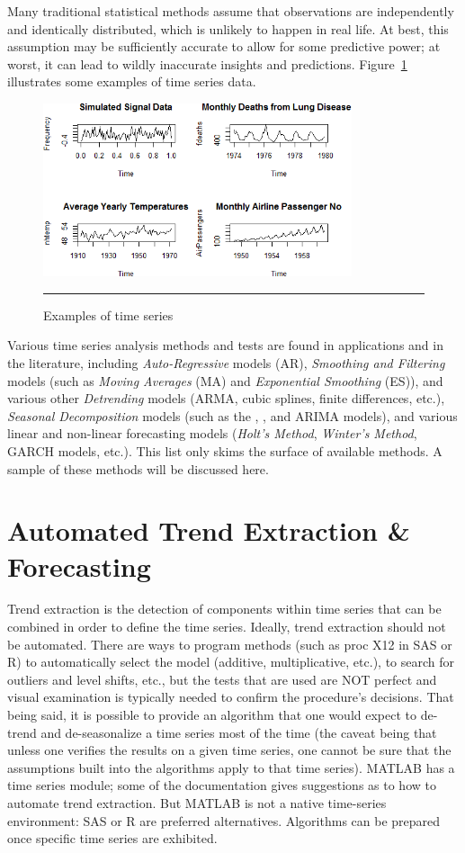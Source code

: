 Many traditional statistical methods assume that observations are independently and identically distributed, which is unlikely to happen in real life. At best, this assumption may be sufficiently accurate to allow for some predictive power; at worst, it can lead to wildly inaccurate insights and predictions. Figure~\ref{fig:example} illustrates some examples of time series data. 
\begin{figure}[t]
\centering
\includegraphics[width=0.81\textwidth]{Images/Example.png}
\caption{Examples of time series}\hrule
\label{fig:example}
\end{figure}
Various time series analysis methods and tests are found in applications and in the literature, including \textit{Auto-Regressive} models (AR), \textit{Smoothing and Filtering} models (such as \textit{Moving Averages} (MA) and \textit{Exponential Smoothing} (ES)), and various other \textit{Detrending} models (ARMA, cubic splines, finite differences, etc.), \textit{Seasonal Decomposition} models (such as the , ,  and ARIMA models), and various linear and non-linear forecasting models (\textit{Holt's Method}, \textit{Winter's Method}, GARCH models, etc.). This list only skims the surface of available methods. A sample of these methods will be discussed here.

\section{Automated Trend Extraction \& Forecasting} 
Trend extraction is the detection of components within time series that can be combined in order to define the time series. Ideally, trend extraction should not be automated. There are ways to program methods (such as proc X12 in SAS or R) to automatically select the model (additive, multiplicative, etc.), to search for outliers and level shifts, etc., but the tests that are used are NOT perfect and visual examination is typically needed to confirm the procedure's decisions. That being said, it is possible to provide an algorithm that one would expect to de-trend and de-seasonalize a time series most of the time (the caveat being that unless one verifies the results on a given time series, one cannot be sure that the assumptions built into the algorithms apply to that time series). MATLAB has a time series module; some of the documentation gives suggestions as to how to automate trend extraction. But MATLAB is not a native time-series environment: SAS or R are preferred alternatives. Algorithms can be prepared once specific time series are exhibited. 


